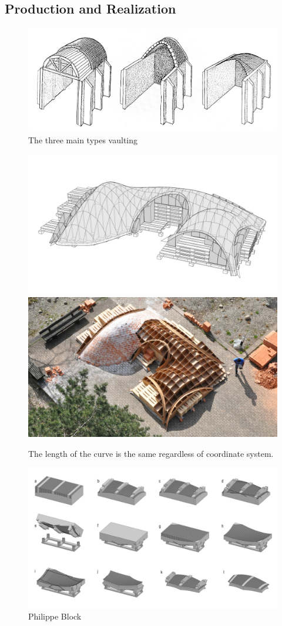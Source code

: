 \subsection{Production and Realization}
\begin{figure}[H]
\centering
\includegraphics[width=0.9\linewidth ]{figure/Introduction/vaulting2.pdf}
\caption{The three main types vaulting}
\end{figure}






\begin{figure}[H]
\centering
\includegraphics[width=0.45\linewidth ]{figure/Introduction/VaultBlock2.jpg}
\includegraphics[width=0.45\linewidth ]{figure/Introduction/VaultBlock.jpg}

\caption{The length of the curve is the same regardless of coordinate system.}
\end{figure}






\begin{figure}[H]
\centering
\includegraphics[width=0.9\linewidth ]{figure/Introduction/digitalstereotomyBlock.jpg}
\caption{Philippe Block}
\end{figure}

